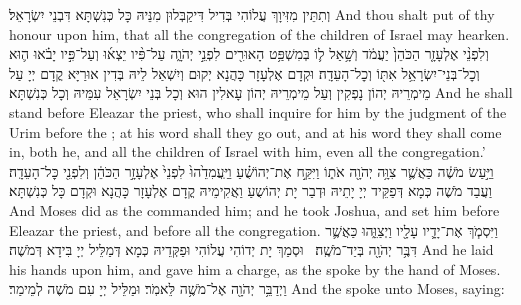 {וְתִתֵּין מִזִּיוָךְ עֲלוֹהִי בְּדִיל דִּיקַבְּלוּן מִנֵּיהּ כָּל כְּנִשְׁתָּא דִּבְנֵי יִשְׂרָאֵל׃}
{And thou shalt put of thy honour upon him, that all the congregation of the children of Israel may hearken.}{}
{וְלִפְנֵ֨י אֶלְעָזָ֤ר הַכֹּהֵן֙ יַעֲמֹ֔ד וְשָׁ֥אַל ל֛וֹ בְּמִשְׁפַּ֥ט הָאוּרִ֖ים לִפְנֵ֣י יְהֹוָ֑ה עַל־פִּ֨יו יֵצְא֜וּ וְעַל־פִּ֣יו יָבֹ֗אוּ ה֛וּא וְכׇל־בְּנֵי־יִשְׂרָאֵ֥ל אִתּ֖וֹ וְכׇל־הָעֵדָֽה׃
}
{וּקְדָם אֶלְעָזָר כָּהֲנָא יְקוּם וְיִשְׁאַל לֵיהּ בְּדִין אוּרַיָּא קֳדָם יְיָ עַל מֵימְרֵיהּ יְהוֹן נָפְקִין וְעַל מֵימְרֵיהּ יְהוֹן עָאלִין הוּא וְכָל בְּנֵי יִשְׂרָאֵל עִמֵּיהּ וְכָל כְּנִשְׁתָּא׃}
{And he shall stand before Eleazar the priest, who shall inquire for him by the judgment of the Urim before the \lord; at his word shall they go out, and at his word they shall come in, both he, and all the children of Israel with him, even all the congregation.’}{}
{וַיַּ֣עַשׂ מֹשֶׁ֔ה כַּאֲשֶׁ֛ר צִוָּ֥ה יְהֹוָ֖ה אֹת֑וֹ וַיִּקַּ֣ח אֶת־יְהוֹשֻׁ֗עַ וַיַּֽעֲמִדֵ֙הוּ֙ לִפְנֵי֙ אֶלְעָזָ֣ר הַכֹּהֵ֔ן וְלִפְנֵ֖י כׇּל־הָעֵדָֽה׃
}
{וַעֲבַד מֹשֶׁה כְּמָא דְּפַקֵּיד יְיָ יָתֵיהּ וּדְבַר יָת יְהוֹשֻעַ וַאֲקִימֵיהּ קֳדָם אֶלְעָזָר כָּהֲנָא וּקְדָם כָּל כְּנִשְׁתָּא׃}
{And Moses did as the \lord\space commanded him; and he took Joshua, and set him before Eleazar the priest, and before all the congregation.}{}
{וַיִּסְמֹ֧ךְ אֶת־יָדָ֛יו עָלָ֖יו וַיְצַוֵּ֑הוּ כַּאֲשֶׁ֛ר דִּבֶּ֥ר יְהֹוָ֖ה בְּיַד־מֹשֶֽׁה׃ \petucha 
{}}
{וּסְמַךְ יָת יְדוֹהִי עֲלוֹהִי וּפַקְּדֵיהּ כְּמָא דְּמַלֵּיל יְיָ בִּידָא דְּמֹשֶׁה׃}
{And he laid his hands upon him, and gave him a charge, as the \lord\space spoke by the hand of Moses.}{}
\newperek
{}%
{וַיְדַבֵּ֥ר יְהֹוָ֖ה אֶל־מֹשֶׁ֥ה לֵּאמֹֽר׃}
{וּמַלֵּיל יְיָ עִם מֹשֶׁה לְמֵימַר׃}
{And the \lord\space spoke unto Moses, saying:}{}
